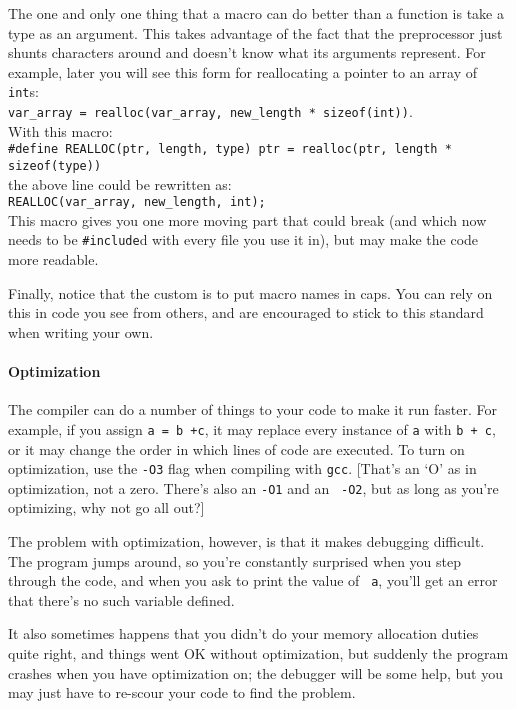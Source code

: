 \documentclass[12pt]{article}
\makeatletter
\def\ind#1{\index{#1}#1}
\def\ttind#1{\index{#1@{\tt #1}}{\tt #1}}
\makeatother
\begin{document}
The one and only one thing that a macro can do better than a function is
take a type as an argument. This takes advantage of the fact that the preprocessor 
just shunts characters around and doesn't know what its arguments represent.
For example, later you will see this form for reallocating a pointer to an array of {\tt int}s:\\
{\tt var\_array = realloc(var\_array, new\_length * sizeof(int))}.\\
With this macro:\\
{\tt \#define REALLOC(ptr, length, type) ptr = realloc(ptr, length * sizeof(type))}\\
the above line could be rewritten as:\\
{\tt REALLOC(var\_array, new\_length, int);}\\
This macro gives you one more moving part that could break (and which
now needs to be {\tt \#include}d with every file you use it in), but
may make the code more readable.

Finally, notice that the custom is to put macro names in caps.  You can
rely on this in code you see from others, and are encouraged to stick
to this standard when writing your own.

\paragraph{Optimization}
The \ttind{gcc} compiler can do a number of things to your code to make it
run faster. For example, if you assign {\tt a = b +c}, it may replace
every instance of {\tt a} with {\tt b + c}, or it may change the order
in which lines of code are executed. To turn on \ind{optimization},
use the {\tt -O3} flag when compiling with {\tt gcc}. [That's an `O'
as in optimization, not a zero. There's also an {\tt -O1} and an {\tt
-O2}, but as long as you're optimizing, why not go all out?]

The problem with optimization, however, is that it makes debugging
difficult. The program jumps around, so you're constantly surprised when
you step through the code, and when you ask to print the value of {\tt
a}, you'll get an error that there's no such variable defined.

It also sometimes happens that you didn't do your memory allocation duties
quite right, and things went OK without optimization, but suddenly the
program crashes when you have optimization on; the debugger will be some
help, but you may just have to re-scour your code to find the problem.
\end{document}
